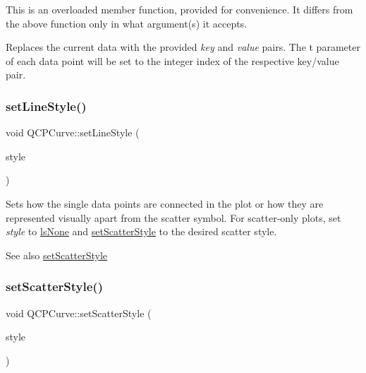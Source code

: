 This is an overloaded member function, provided for convenience. It differs from the above function only in what argument(s) it accepts.

Replaces the current data with the provided {\itshape key} and {\itshape value} pairs. The t parameter of each data point will be set to the integer index of the respective key/value pair. \hypertarget{class_q_c_p_curve_a4a377ec863ff81a1875c3094a6177c19}{}\label{class_q_c_p_curve_a4a377ec863ff81a1875c3094a6177c19} 
\subsubsection{\texorpdfstring{set\+Line\+Style()}{setLineStyle()}}
{\footnotesize\ttfamily void Q\+C\+P\+Curve\+::set\+Line\+Style (\begin{DoxyParamCaption}\item[{\hyperlink{class_q_c_p_curve_a2710e9f79302152cff794c6e16cc01f1}{Q\+C\+P\+Curve\+::\+Line\+Style}}]{style }\end{DoxyParamCaption})}

Sets how the single data points are connected in the plot or how they are represented visually apart from the scatter symbol. For scatter-\/only plots, set {\itshape style} to \hyperlink{class_q_c_p_curve_a2710e9f79302152cff794c6e16cc01f1aec1601a191cdf0b4e761c4c66092cc48}{ls\+None} and \hyperlink{class_q_c_p_curve_a55e43b44709bf50a35500644988aa706}{set\+Scatter\+Style} to the desired scatter style.

\begin{DoxySeeAlso}{See also}
\hyperlink{class_q_c_p_curve_a55e43b44709bf50a35500644988aa706}{set\+Scatter\+Style} 
\end{DoxySeeAlso}
\hypertarget{class_q_c_p_curve_a55e43b44709bf50a35500644988aa706}{}\label{class_q_c_p_curve_a55e43b44709bf50a35500644988aa706} 
\subsubsection{\texorpdfstring{set\+Scatter\+Style()}{setScatterStyle()}}
{\footnotesize\ttfamily void Q\+C\+P\+Curve\+::set\+Scatter\+Style (\begin{DoxyParamCaption}\item[{const \hyperlink{class_q_c_p_scatter_style}{Q\+C\+P\+Scatter\+Style} \&}]{style }\end{DoxyParamCaption})}

